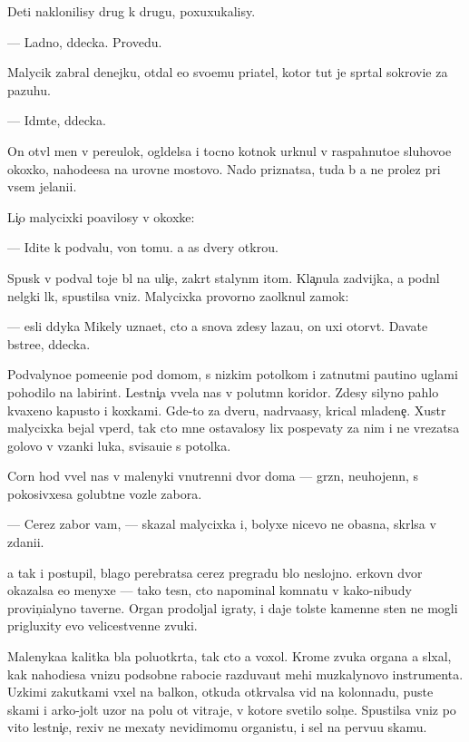 \documentclass[10pt]{book}
\begin{document}
Deti naklonilisy drug k drugu, poxuxukalisy.

— Ladno, d{\ia}decka. Provedu.

Malycik zabral denejku, otdal {\y}e{\y}o svo{\y}emu pri{\y}atel{\iu}, kotor{\yi}{\y} tut je spr{\ia}tal sokrovi{\x}e za pazuhu.

— Id{\e}mte, d{\ia}decka.

On otv{\e}l men{\ia} v pereulok, ogl{\ia}delsa i tocno kot{\e}nok {\y}urknul v raspahnuto{\y}e sluhovo{\y}e okoxko, nahod{\ia}{\x}e{\y}esa na urovne mostovo{\y}. Nado priznatsa, tuda b{\yi} {\y}a ne prolez pri vsem jelani{\y}i.

Li{\c}o malycixki po{\y}avilosy v okoxke:

— Idite k podvalu, von tomu. {\Y}a {\x}as dvery otkro{\y}u.

Spusk v podval toje b{\yi}l na uli{\c}e, zakr{\yi}t{\yi}{\y} stalyn{\yi}m {\x}itom. Kla{\c}nula zadvijka, {\y}a podn{\ia}l nel{\e}gki{\y} l{\iu}k, spustilsa vniz. Malycixka provorno za{\x}olknul zamok:

— {\Y}esli d{\ia}dyka Mikely uzna{\y}et, cto {\y}a snova zdesy laza{\y}u, on uxi otorv{\e}t. Dava{\y}te b{\yi}stre{\y}e, d{\ia}decka.

Podvalyno{\y}e pome{\x}eni{\y}e pod domom, s nizkim potolkom i zat{\ia}nut{\yi}mi pautino{\y} uglami pohodilo na labirint. Lestni{\c}a v{\yi}vela nas v polut{\e}mn{\yi}{\y} koridor. Zdesy silyno pahlo kvaxeno{\y} kapusto{\y} i koxkami. Gde-to za dver{\y}u, nadr{\yi}va{\y}asy, krical mladene{\c}. Xustr{\yi}{\y} malycixka bejal vper{\e}d, tak cto mne ostavalosy lix pospevaty za nim i ne vrezatsa golovo{\y} v v{\ia}zanki luka, svisa{\y}u{\x}i{\y}e s potolka.

Corn{\yi}{\y} hod v{\yi}vel nas v malenyki{\y} vnutrenni{\y} dvor doma — gr{\ia}zn{\yi}{\y}, neuhojenn{\yi}{\y}, s pokosivxe{\y}sa golub{\ia}tne{\y} vozle zabora.

— Cerez zabor vam, — skazal malycixka i, bolyxe nicevo ne ob{\y}asn{\ia}{\y}a, skr{\yi}lsa v zdani{\y}i.

{\Y}a tak i postupil, blago perebratsa cerez pregradu b{\yi}lo neslojno. {\C}erkovn{\yi}{\y} dvor okazalsa {\y}e{\x}o menyxe — tako{\y} tesn{\yi}{\y}, cto napominal komnatu v kako{\y}-nibudy provin{\c}ialyno{\y} taverne. Organ prodoljal igraty, i daje tolst{\yi}{\y}e kamenn{\yi}{\y}e sten{\yi} ne mogli prigluxity {\y}evo velicestvenn{\yi}{\y}e zvuki.

Malenyka{\y}a kalitka b{\yi}la poluotkr{\yi}ta, tak cto {\y}a voxol. Krome zvuka organa {\y}a sl{\yi}xal, kak nahod{\ia}{\x}i{\y}esa vnizu podsobn{\yi}{\y}e raboci{\y}e razduva{\y}ut mehi muz{\yi}kalynovo instrumenta. Uzkimi zakutkami v{\yi}xel na balkon, otkuda otkr{\yi}valsa vid na kolonnadu, pust{\yi}{\y}e skam{\yf}i i {\y}arko-jolt{\yi}{\y} uzor na polu ot vitraje{\y}, v kotor{\yi}{\y}e svetilo soln{\c}e. Spustilsa vniz po vito{\y} lestni{\c}e, rexiv ne mexaty nevidimomu organistu, i sel na pervu{\y}u skam{\y}u.
\end{document}
